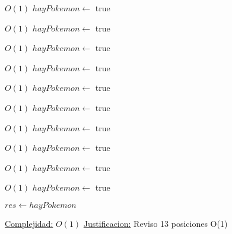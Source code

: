 \begin{Algoritmos}
\begin{algorithmic}[1]
             \Comment $O(1)$
            \State $hayPokemon \gets$ true
        \EndIf
    \EndIf

             \Comment $O(1)$
            \State $hayPokemon \gets$ true
        \EndIf
    \EndIf

\EndIf


         \Comment $O(1)$
        \State $hayPokemon \gets$ true
    \EndIf


             \Comment $O(1)$
            \State $hayPokemon \gets$ true
        \EndIf

    \EndIf

\EndIf


         \Comment $O(1)$
        \State $hayPokemon \gets$ true
    \EndIf


             \Comment $O(1)$
            \State $hayPokemon \gets$ true
        \EndIf


    \EndIf

\EndIf

         \Comment $O(1)$
        \State $hayPokemon \gets$ true
        \EndIf

             \Comment $O(1)$
            \State $hayPokemon \gets$ true
        \EndIf
    \EndIf

             \Comment $O(1)$
            \State $hayPokemon \gets$ true
        \EndIf

    \EndIf
\EndIf

         \Comment $O(1)$
        \State $hayPokemon \gets$ true
    \EndIf
\EndIf

\State $res \gets hayPokemon$

\medskip
\State \underline{Complejidad:} $O(1)$ %
\State \underline{Justificacion:} Reviso 13 posiciones O(1)


\end{algorithmic}
\end{Algoritmos}
